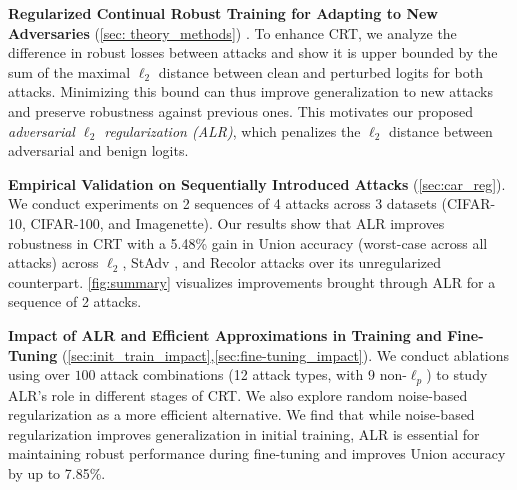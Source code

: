 \noindent \textbf{Regularized Continual Robust Training for Adapting to New Adversaries} (\cref{sec: theory_methods}) . To enhance CRT, we analyze the difference in robust losses between attacks and show it is upper bounded by the sum of the maximal $\ell_2$ distance between clean and perturbed logits for both attacks. Minimizing this bound can thus improve generalization to new attacks and preserve robustness against previous ones. This motivates our proposed \textit{adversarial $\ell_2$ regularization (ALR)}, which penalizes the $\ell_2$ distance between adversarial and benign logits.

\noindent \textbf{Empirical Validation on Sequentially Introduced Attacks} (\cref{sec:car_reg}).
We conduct experiments on 2 sequences of 4 attacks across 3 datasets (CIFAR-10, CIFAR-100, and Imagenette). Our results show that ALR improves robustness in CRT with a 5.48\% gain in Union accuracy (worst-case across all attacks) across $\ell_2$, StAdv \citep{XiaoZ0HLS18}, and Recolor attacks \citep{LaidlawF19} over its unregularized counterpart. \cref{fig:summary} visualizes improvements brought through ALR for a sequence of 2 attacks.  %

\noindent \textbf{Impact of ALR and Efficient Approximations in Training and Fine-Tuning} (\cref{sec:init_train_impact},\cref{sec:fine-tuning_impact}). We conduct ablations using over $100$ attack combinations (12 attack types, with 9 non-$\ell_p$) to study ALR’s role in different stages of CRT. We also explore random noise-based regularization as a more efficient alternative.  We find that while noise-based regularization improves generalization in initial training, ALR is essential for maintaining robust performance during fine-tuning and improves Union accuracy by up to 7.85\%.


